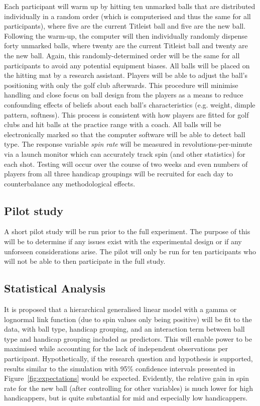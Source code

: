 \documentclass{article}
\begin{document}
Each participant will warm up by hitting ten unmarked balls that are distributed individually in a random order (which is computerised and thus the same for all participants), where five are the current Titleist ball and five are the new ball. 
Following the warm-up, the computer will then individually randomly dispense forty unmarked balls, where twenty are the current Titleist ball and twenty are the new ball. 
Again, this randomly-determined order will be the same for all participants to avoid any potential equipment biases.
All balls will be placed on the hitting mat by a research assistant.
Players will be able to adjust the ball's positioning with only the golf club afterwards.
This procedure will minimise handling and close focus on ball design from the players as a means to reduce confounding effects of beliefs about each ball's characteristics (e.g. weight, dimple pattern, softness).
This process is consistent with how players are fitted for golf clubs and hit balls at the practice range with a coach. 
All balls will be electronically marked so that the computer software will be able to detect ball type. 
The response variable \textit{spin rate} will be measured in revolutions-per-minute via a launch monitor which can accurately track spin (and other statistics) for each shot. 
Testing will occur over the course of two weeks and even numbers of players from all three handicap groupings will be recruited for each day to counterbalance any methodological effects.

\subsection*{Pilot study}

A short pilot study will be run prior to the full experiment.
The purpose of this will be to determine if any issues exist with the experimental design or if any unforseen considerations arise.
The pilot will only be run for ten participants who will not be able to then participate in the full study.

\subsection*{Statistical Analysis}

It is proposed that a hierarchical generalised linear model with a gamma or lognormal link function (due to spin values only being positive) will be fit to the data, with ball type, handicap grouping, and an interaction term between ball type and handicap grouping included as predictors. 
This will enable power to be maximised while accounting for the lack of independent observations per participant.
Hypothetically, if the research question and hypothesis is supported, results similar to the simulation with 95\% confidence intervals presented in Figure~\ref{fig:expectations} would be expected.
Evidently, the relative gain in spin rate for the new ball (after controlling for other variables) is much lower for high handicappers, but is quite substantial for mid and especially low handicappers. 
\end{document}
